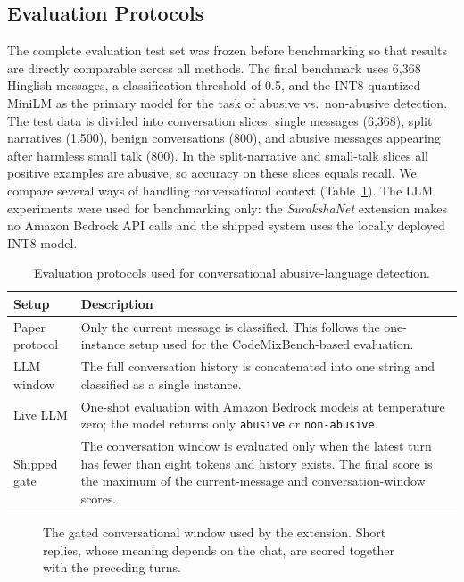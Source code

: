 \documentclass[sigconf,9pt]{acmart}
\begin{document}
\subsection{Evaluation Protocols}
The complete evaluation test set was frozen before benchmarking so that results are directly comparable across all methods. The final benchmark uses 6,368 Hinglish messages, a classification threshold of 0.5, and the INT8-quantized MiniLM as the primary model for the task of abusive vs.\ non-abusive detection. The test data is divided into conversation slices: single messages (6{,}368), split narratives (1{,}500), benign conversations (800), and abusive messages appearing after harmless small talk (800). In the split-narrative and small-talk slices all positive examples are abusive, so accuracy on these slices equals recall. We compare several ways of handling conversational context (Table~\ref{tab:evaluation_protocols}). The LLM experiments were used for benchmarking only: the \textit{SurakshaNet} extension makes no Amazon Bedrock API calls and the shipped system uses the locally deployed INT8 model.

\begin{table}[t]
\centering
\caption{Evaluation protocols used for conversational abusive-language detection.}
\label{tab:evaluation_protocols}
\small
\begin{tabularx}{\linewidth}{@{}l X@{}}
\toprule
\textbf{Setup} & \textbf{Description} \\
\midrule
Paper protocol &
Only the current message is classified. This follows the one-instance setup used for the CodeMixBench-based evaluation. \\
\addlinespace[3pt]
LLM window &
The full conversation history is concatenated into one string and classified as a single instance. \\
\addlinespace[3pt]
Live LLM &
One-shot evaluation with Amazon Bedrock models at temperature zero; the model returns only \texttt{abusive} or \texttt{non-abusive}. \\
\addlinespace[3pt]
Shipped gate &
The conversation window is evaluated only when the latest turn has fewer than eight tokens and history exists. The final score is the maximum of the current-message and conversation-window scores. \\
\bottomrule
\end{tabularx}
\end{table}


\begin{figure}[h!]
  \centering
  \resizebox{\columnwidth}{!}{}
  \caption{The gated conversational window used by the extension. Short replies, whose meaning depends on the chat, are scored together with the preceding turns.}
  \label{fig:gate}
\end{figure}
\end{document}
